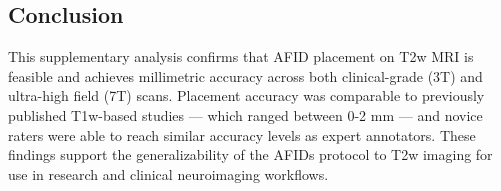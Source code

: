 \subsection{Conclusion}
This supplementary analysis confirms that AFID placement on T2w MRI is feasible and achieves millimetric accuracy across both clinical-grade (3T) and ultra-high field (7T) scans. Placement accuracy was comparable to previously published T1w-based studies \cite{Lau2019-eh,Abbass2022-lf} --- which ranged between 0-2 mm --- and novice raters were able to reach similar accuracy levels as expert annotators. These findings support the generalizability of the AFIDs protocol to T2w imaging for use in research and clinical neuroimaging workflows.


\newpage